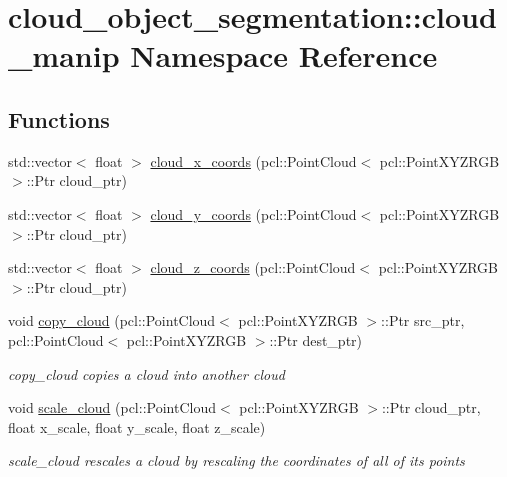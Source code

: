 \hypertarget{namespacecloud__object__segmentation_1_1cloud__manip}{}\section{cloud\+\_\+object\+\_\+segmentation\+:\+:cloud\+\_\+manip Namespace Reference}
\label{namespacecloud__object__segmentation_1_1cloud__manip}
\subsection*{Functions}
\begin{DoxyCompactItemize}
\item 
std\+::vector$<$ float $>$ \hyperlink{namespacecloud__object__segmentation_1_1cloud__manip_a18a97c1fa06e54fe01bd351e36efb92c}{cloud\+\_\+x\+\_\+coords} (pcl\+::\+Point\+Cloud$<$ pcl\+::\+Point\+X\+Y\+Z\+R\+GB $>$\+::Ptr cloud\+\_\+ptr)
\item 
std\+::vector$<$ float $>$ \hyperlink{namespacecloud__object__segmentation_1_1cloud__manip_a9adbd0e82fa85d54475815211e215018}{cloud\+\_\+y\+\_\+coords} (pcl\+::\+Point\+Cloud$<$ pcl\+::\+Point\+X\+Y\+Z\+R\+GB $>$\+::Ptr cloud\+\_\+ptr)
\item 
std\+::vector$<$ float $>$ \hyperlink{namespacecloud__object__segmentation_1_1cloud__manip_ad950565d49f0ee458f479f76c854dfe2}{cloud\+\_\+z\+\_\+coords} (pcl\+::\+Point\+Cloud$<$ pcl\+::\+Point\+X\+Y\+Z\+R\+GB $>$\+::Ptr cloud\+\_\+ptr)
\item 
void \hyperlink{namespacecloud__object__segmentation_1_1cloud__manip_a7923ab0797d8685324b17084089a5161}{copy\+\_\+cloud} (pcl\+::\+Point\+Cloud$<$ pcl\+::\+Point\+X\+Y\+Z\+R\+GB $>$\+::Ptr src\+\_\+ptr, pcl\+::\+Point\+Cloud$<$ pcl\+::\+Point\+X\+Y\+Z\+R\+GB $>$\+::Ptr dest\+\_\+ptr)
\begin{DoxyCompactList}\small\item\em copy\+\_\+cloud copies a cloud into another cloud \end{DoxyCompactList}\item 
void \hyperlink{namespacecloud__object__segmentation_1_1cloud__manip_ab703c921b31ce44f8b3f629c5940aab0}{scale\+\_\+cloud} (pcl\+::\+Point\+Cloud$<$ pcl\+::\+Point\+X\+Y\+Z\+R\+GB $>$\+::Ptr cloud\+\_\+ptr, float x\+\_\+scale, float y\+\_\+scale, float z\+\_\+scale)
\begin{DoxyCompactList}\small\item\em scale\+\_\+cloud rescales a cloud by rescaling the coordinates of all of its points \end{DoxyCompactList}\item 

\end{DoxyCompactItemize}
